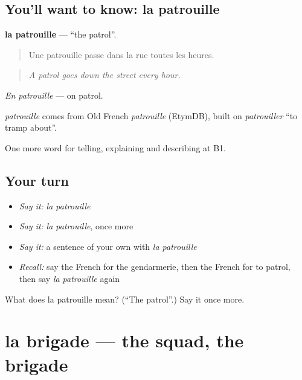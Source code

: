 \subsection*{You'll want to know: la patrouille}
\textbf{la patrouille} — \textquotedblleft{}the patrol\textquotedblright{}.

\begin{quote}
Une patrouille passe dans la rue toutes les heures.
\end{quote}

\begin{quote}
\emph{A patrol goes down the street every hour.}
\end{quote}

\emph{En patrouille} — on patrol.

\begin{cousinweb}
\emph{patrouille} comes from Old French \emph{patrouille} (EtymDB), built on \emph{patrouiller} \textquotedblleft{}to tramp about\textquotedblright{}.
\end{cousinweb}

\begin{grammarlens}[title={What you've built}]
One more word for telling, explaining and describing at B1.
\end{grammarlens}

\subsection*{Your turn}
\begin{itemize}
\raggedright
  \item \emph{Say it:} \emph{la patrouille}
  \item \emph{Say it:} \emph{la patrouille}, once more
  \item \emph{Say it:} a sentence of your own with \emph{la patrouille}
  \item \emph{Recall:} say the French for the gendarmerie, then the French for to patrol, then say \emph{la patrouille} again
\end{itemize}

\begin{tcolorbox}[breakable,colback=teal!4,colframe=teal!35!black,title={Before you move on}]
What does la patrouille mean? (\textquotedblleft{}The patrol\textquotedblright{}.) Say it once more.
\end{tcolorbox}
\section[la brigade]{la brigade — the squad, the brigade}


